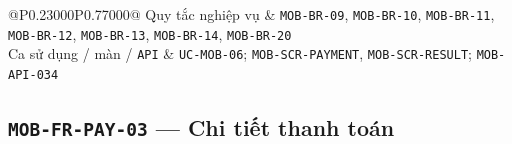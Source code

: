 \begin{longtable}{@{}P{0.23000\SRSWidth}P{0.77000\SRSWidth}@{}}
Quy tắc nghiệp vụ & \texttt{MOB-\allowbreak{}BR-\allowbreak{}09}, \texttt{MOB-\allowbreak{}BR-\allowbreak{}10}, \texttt{MOB-\allowbreak{}BR-\allowbreak{}11}, \texttt{MOB-\allowbreak{}BR-\allowbreak{}12}, \texttt{MOB-\allowbreak{}BR-\allowbreak{}13}, \texttt{MOB-\allowbreak{}BR-\allowbreak{}14}, \texttt{MOB-\allowbreak{}BR-\allowbreak{}20} \\[3pt]
Ca sử dụng /\allowbreak{} màn /\allowbreak{} \texttt{API} & \texttt{UC-\allowbreak{}MOB-\allowbreak{}06}; \texttt{MOB-\allowbreak{}SCR-\allowbreak{}PAYMENT}, \texttt{MOB-\allowbreak{}SCR-\allowbreak{}RESULT}; \texttt{MOB-\allowbreak{}API-\allowbreak{}034} \\[3pt]
\end{longtable}
\endgroup

\subsection{\texttt{MOB-\allowbreak{}FR-\allowbreak{}PAY-\allowbreak{}03} — Chi tiết thanh toán}
\begingroup
\fontsize{9.5}{12}\selectfont
\setlength{\SRSWidth}{\dimexpr\linewidth-2\tabcolsep\relax}
